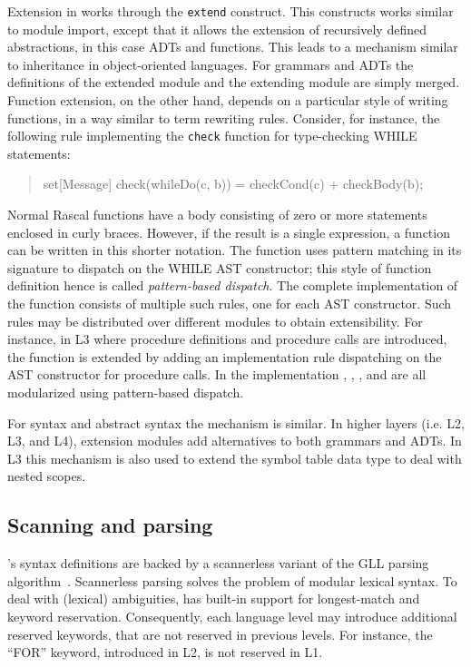 Extension in \Rascal works through the \texttt{extend} construct. This
constructs works similar to module import, except that it allows the
extension of recursively defined abstractions, in this case ADTs and
functions. This leads to a mechanism similar to inheritance in
object-oriented languages. For grammars and ADTs the
definitions of the extended module and the extending module are simply
merged. Function extension, on the other hand, depends on a particular
style of writing \Rascal functions, in a way similar to term rewriting
rules. Consider, for instance, the
following rule implementing the \texttt{check} function for
type-checking WHILE statements:
\begin{quote}
\begin{rascal}
set[Message] check(whileDo(c, b)) =
                 checkCond(c) + checkBody(b);
\end{rascal}
\end{quote}
Normal Rascal functions have a body consisting of zero or more statements  enclosed in curly braces. However, if the result is a single expression, a function can be written in this shorter notation. The function uses pattern
matching in its signature to dispatch on the WHILE AST constructor;
this style of function definition hence is called
\textit{pattern-based dispatch}. The complete implementation of the
 function consists of multiple such rules, one for each
AST constructor. Such rules may be distributed over different modules
to obtain extensibility. For instance, in L3 where procedure
definitions and procedure calls are introduced, the 
function is extended by adding an implementation rule dispatching on
the AST constructor for procedure calls. In the \oberon implementation
, , , and 
are all modularized using pattern-based dispatch.

For syntax and abstract syntax the mechanism is similar. In higher
layers (i.e. L2, L3, and L4), extension modules add alternatives to
both grammars and ADTs. In L3 this mechanism is also used to extend
the symbol table data type to deal with nested scopes. 

\subsection{Scanning and parsing}

\noindent \Rascal's syntax definitions are backed by a scannerless variant of the GLL parsing algorithm~\cite{GLL}. Scannerless
parsing solves the problem of modular lexical syntax. To deal with
(lexical) ambiguities, \Rascal has built-in support for longest-match
and keyword reservation. Consequently, each language level may
introduce additional reserved keywords, that are not reserved in
previous levels. For instance, the ``FOR'' keyword, introduced in L2,
is not reserved in L1.

